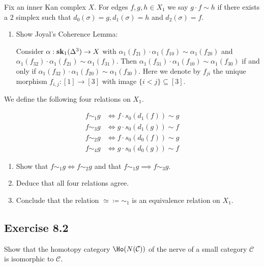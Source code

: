 Fix an inner Kan complex $ X $. For edges $ f , g , h \in X_1 $ we say $ g \cdot f \sim h $ if there exists a 2 simplex such that $d_0 ( \sigma ) = g , d_1 ( \sigma ) = h $ and $ d_2 ( \sigma ) = f $.

\begin{enumerate}
    \item 
    Show Joyal's Coherence Lemma:

    Consider $ \alpha: \bold{sk}_1 ( \Delta^3 ) \to X $ with $ \alpha_1 ( f_{21} ) \cdot \alpha_1 ( f_{10} ) \sim \alpha_1 ( f_{20} ) $ and $ \alpha_1 ( f_{32} ) \cdot \alpha_1 ( f_{21} ) \sim \alpha_1 ( f_{31} )$.
    Then $ \alpha_1 ( f_{31} ) \cdot \alpha_1 ( f_{10} ) \sim \alpha_1 ( f_{30} )$ if and only if $ \alpha_1 ( f_{32} ) \cdot \alpha_1 ( f_{20} ) \sim \alpha_1 ( f_{30} ) $.
    Here we denote by $ f_{ji} $ the unique morphism $ f_{ i , j } : [1 ] \to [ 3 ]$ with image $ \{ i < j \} \subseteq [ 3 ] $.
\end{enumerate}

We define the following four relations on $X_1$.

\begin{align*}
    f \sim_1 g & \iff f \cdot s_0 ( d_1 ( f ) ) \sim g 
    \\
    f \sim_3 g & \iff g \cdot s_0 ( d_1 ( g ) ) \sim f
\end{align*}
\qquad
\begin{align*}
    f \sim_2 g & \iff f \cdot s_0 ( d_0 ( f ) ) \sim g 
    \\
    f \sim_4 g & \iff g \cdot s_0 ( d_0 ( g ) ) \sim f
\end{align*}

\begin{enumerate}[label=(\alph*), resume]
    \item 
    Show that $ f \sim_1 g \iff f \sim_2 g $ and that $ f \sim_1 g \implies f \sim_3 g $.

    \item 
    Deduce that all four relations agree.

    \item 
    Conclude that the relation $ \simeq \coloneqq \sim_1 $ is an equivalence relation on $X_1$.
\end{enumerate}

\subsection{Exercise 8.2}

Show that the homotopy category $ \Ho ( N ( \mathcal{ C } ) ) $ of the nerve of a small category $ \mathcal{ C } $ is isomorphic to $ \mathcal{ C } $.

